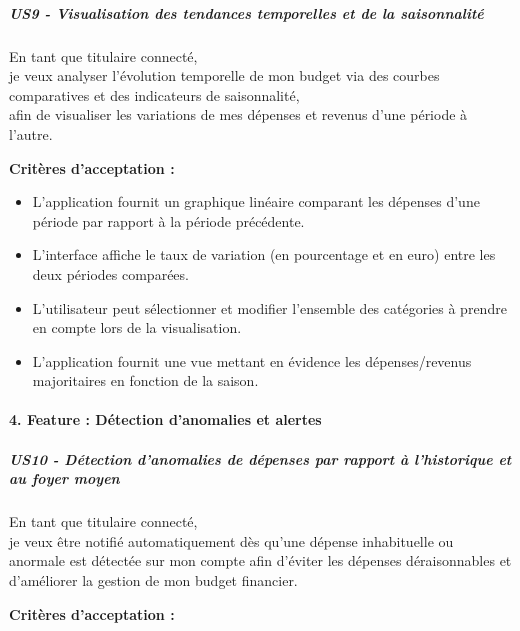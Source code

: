 \hypertarget{us9---visualisation-des-tendances-temporelles-et-de-la-saisonnalituxe9}{%
\subparagraph{US9 - Visualisation des tendances temporelles et de la
saisonnalité}\label{us9---visualisation-des-tendances-temporelles-et-de-la-saisonnalituxe9}}

En tant que titulaire connecté,\\
je veux analyser l'évolution temporelle de mon budget via des courbes
comparatives et des indicateurs de saisonnalité,\\
afin de visualiser les variations de mes dépenses et revenus d'une
période à l'autre.

\textbf{Critères d'acceptation :}

\begin{itemize}
\tightlist
\item
  L'application fournit un graphique linéaire comparant les dépenses
  d'une période par rapport à la période précédente.
\item
  L'interface affiche le taux de variation (en pourcentage et en euro)
  entre les deux périodes comparées.
\item
  L'utilisateur peut sélectionner et modifier l'ensemble des catégories
  à prendre en compte lors de la visualisation.
\item
  L'application fournit une vue mettant en évidence les dépenses/revenus
  majoritaires en fonction de la saison.
\end{itemize}

\hypertarget{feature-duxe9tection-danomalies-et-alertes}{%
\paragraph{4. Feature : Détection d'anomalies et
alertes}\label{feature-duxe9tection-danomalies-et-alertes}}

\hypertarget{us10---duxe9tection-danomalies-de-duxe9penses-par-rapport-uxe0-lhistorique-et-au-foyer-moyen}{%
\subparagraph{US10 - Détection d'anomalies de dépenses par rapport à
l'historique et au foyer
moyen}\label{us10---duxe9tection-danomalies-de-duxe9penses-par-rapport-uxe0-lhistorique-et-au-foyer-moyen}}

En tant que titulaire connecté,\\
je veux être notifié automatiquement dès qu'une dépense inhabituelle ou
anormale est détectée sur mon compte afin d'éviter les dépenses
déraisonnables et d'améliorer la gestion de mon budget financier.

\textbf{Critères d'acceptation :}

